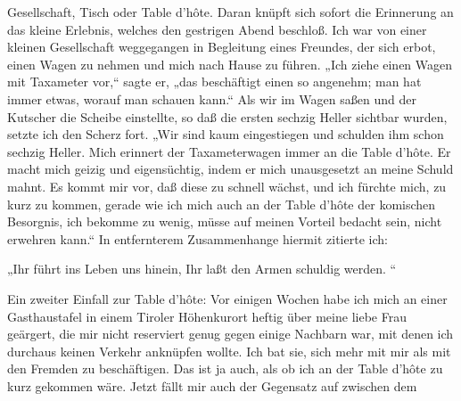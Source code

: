 \documentclass{article}
\begin{document}
            
        \pstart
        Gesellschaft, Tisch oder Table d’hôte. Daran
               knüpft sich sofort die Erinnerung an das kleine Erlebnis, welches den
               gestrigen Abend beschloß. Ich war von einer kleinen Gesellschaft weggegangen in
               Begleitung eines Freundes, der sich erbot, einen Wagen zu nehmen und mich nach
               Hause zu führen. „Ich ziehe einen Wagen mit Taxameter vor,“ sagte er, „das
               beschäftigt einen so angenehm; man hat immer etwas, worauf man schauen
               kann.“ Als wir im Wagen saßen und der Kutscher die Scheibe einstellte, so daß
               die ersten sechzig Heller sichtbar wurden, setzte ich den Scherz fort. „Wir sind
               kaum eingestiegen und schulden ihm schon sechzig Heller. Mich erinnert der
               Taxameterwagen immer an die Table d’hôte. Er
               macht mich geizig und eigensüchtig, indem er mich unausgesetzt an
               meine Schuld mahnt. Es kommt mir vor, daß diese zu schnell wächst, und ich
               fürchte mich, zu kurz zu kommen, gerade wie ich mich auch an der
               Table d’hôte der komischen Besorgnis, ich bekomme zu
               wenig, müsse auf meinen Vorteil bedacht sein, nicht erwehren kann.“ In
               entfernterem Zusammenhange hiermit zitierte ich:
        \pend
    
            
        \pstart
        „Ihr führt ins Leben uns hinein,
                  Ihr laßt den Armen schuldig werden.
    “
        \pend
    
            
        \pstart
        Ein zweiter Einfall zur Table d’hôte: Vor einigen Wochen habe ich mich an einer
                  Gasthaustafel in einem Tiroler Höhenkurort
               heftig über meine liebe Frau geärgert, die mir nicht reserviert genug gegen
               einige Nachbarn war, mit denen ich durchaus keinen Verkehr anknüpfen
               wollte. Ich bat sie, sich mehr mit mir als mit den Fremden zu beschäftigen. Das
               ist ja auch, als ob ich an der Table d’hôte zu kurz
                  gekommen wäre. Jetzt fällt mir auch der Gegensatz auf zwischen dem
        \pend
    
         
            
            
            
\end{document}
